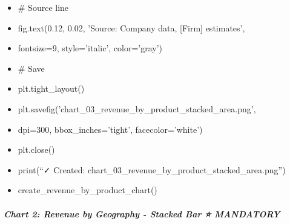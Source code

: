 \documentclass[11pt]{article}
\begin{document}
\begin{itemize}[leftmargin=*,itemsep=2pt,topsep=2pt]
\item {} \# Source line
\item {} fig.text(0.12, 0.02, 'Source: Company data, [Firm] estimates',
\item {} fontsize=9, style='italic', color='gray')
\item {} \# Save
\item {} plt.tight\_\allowbreak{}layout()
\item {} plt.savefig('chart\_\allowbreak{}03\_\allowbreak{}revenue\_\allowbreak{}by\_\allowbreak{}product\_\allowbreak{}stacked\_\allowbreak{}area.png',
\item {} dpi=300, bbox\_\allowbreak{}inches='tight', facecolor='white')
\item {} plt.close()
\item {} print(``✓ Created: chart\_\allowbreak{}03\_\allowbreak{}revenue\_\allowbreak{}by\_\allowbreak{}product\_\allowbreak{}stacked\_\allowbreak{}area.png'')
\item {} create\_\allowbreak{}revenue\_\allowbreak{}by\_\allowbreak{}product\_\allowbreak{}chart()
\end{itemize}

\subparagraph{Chart 2: Revenue by Geography - Stacked Bar ⭐ MANDATORY}\mbox{}\par
\end{document}
